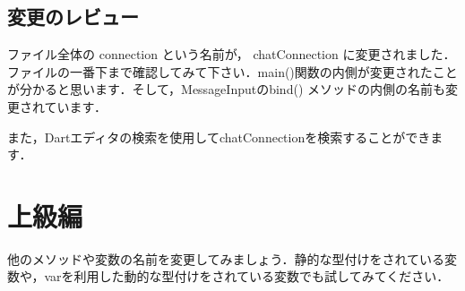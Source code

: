 
\subsection{変更のレビュー}

ファイル全体の connection という名前が， chatConnection に変更されました．ファイルの一番下まで確認してみて下さい．main()関数の内側が変更されたことが分かると思います．そして，MessageInputのbind() メソッドの内側の名前も変更されています．

また，Dartエディタの検索を使用してchatConnectionを検索することができます．


\section{上級編}

他のメソッドや変数の名前を変更してみましょう．静的な型付けをされている変数や，varを利用した動的な型付けをされている変数でも試してみてください．


\clearpage
